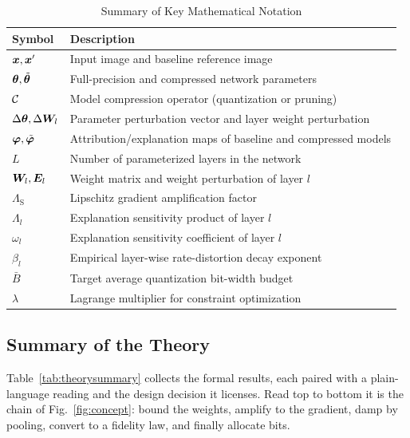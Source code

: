 \begin{table}[!h]
\caption{Summary of Key Mathematical Notation}
\label{tab:notation}
\centering
\begin{tabular}{ll}
\hline
\textbf{Symbol} & \textbf{Description} \\
\hline
$\bm{x}, \bm{x}'$ & Input image and baseline reference image \\
$\bm{\theta}, \tilde{\bm{\theta}}$ & Full-precision and compressed network parameters \\
$\mathcal{C}$ & Model compression operator (quantization or pruning) \\
$\Delta\bm{\theta}, \Delta\bm{W}_l$ & Parameter perturbation vector and layer weight perturbation \\
$\bm{\varphi}, \tilde{\bm{\varphi}}$ & Attribution/explanation maps of baseline and compressed models \\
$L$ & Number of parameterized layers in the network \\
$\bm{W}_l, \bm{E}_l$ & Weight matrix and weight perturbation of layer $l$ \\
$\Lambda_{\mathrm{S}}$ & Lipschitz gradient amplification factor \\
$\Lambda_l$ & Explanation sensitivity product of layer $l$ \\
$\omega_l$ & Explanation sensitivity coefficient of layer $l$ \\
$\beta_l$ & Empirical layer-wise rate-distortion decay exponent \\
$\bar{B}$ & Target average quantization bit-width budget \\
$\lambda$ & Lagrange multiplier for constraint optimization \\
\hline
\end{tabular}
\end{table}

\subsection{Summary of the Theory}
Table~\ref{tab:theorysummary} collects the formal results, each paired with a
plain-language reading and the design decision it licenses. Read top to bottom it
is the chain of Fig.~\ref{fig:concept}: bound the weights, amplify to the
gradient, damp by pooling, convert to a fidelity law, and finally allocate bits.

